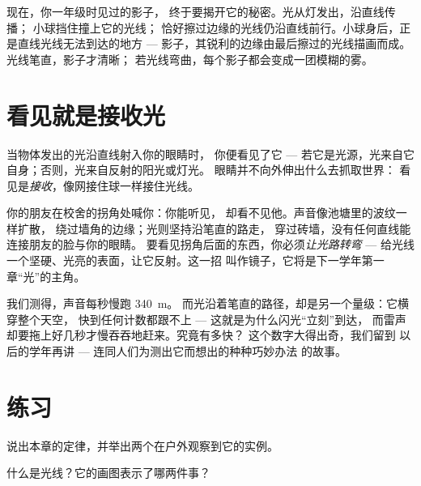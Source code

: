 \begin{example}[影子的成因终于讲清]\label{ex:g4:light-straight-lines:shadows}
现在，你一年级时见过的影子，
终于要揭开它的秘密。光从灯发出，沿直线传播；
小球挡住撞上它的光线；
恰好擦过边缘的光线仍沿直线前行。小球身后，正是直线光线无法到达的地方 ---
影子，其锐利的边缘由最后擦过的光线描画而成。
光线笔直，影子才清晰；
若光线弯曲，每个影子都会变成一团模糊的雾。
\end{example}

\section{看见就是接收光}

\begin{proposition}[看见是怎样发生的]\label{prop:g4:light-straight-lines:seeing}
当物体发出的光沿直线射入你的眼睛时，
你便看见了它 --- 若它是光源，光来自它自身；否则，光来自反射的阳光或灯光。
眼睛并不向外伸出什么去抓取世界：
看见是\emph{接收}，像网接住球一样接住光线。
\end{proposition}

\begin{example}[绕过墙角]\label{ex:g4:light-straight-lines:corner}
你的朋友在校舍的拐角处喊你：你能听见，
却看不见他。声音像池塘里的波纹一样扩散，
绕过墙角的边缘；光则坚持沿笔直的路走，
穿过砖墙，没有任何直线能连接朋友的脸与你的眼睛。
要看见拐角后面的东西，你必须\emph{让光路转弯} ---
给光线一个坚硬、光亮的表面，让它反射。这一招
叫作镜子，它将是下一学年第一章“光”的主角。
\end{example}

\begin{remark}[最快的跑者]\label{rem:g4:light-straight-lines:speed}
我们测得，声音每秒慢跑 \qty{340}{m}。
而光沿着笔直的路径，却是另一个量级：它横穿整个天空，
快到任何计数都跟不上 --- 这就是为什么闪光“立刻”到达，
而雷声却要拖上好几秒才慢吞吞地赶来。究竟有多快？
这个数字大得出奇，我们留到
以后的学年再讲 --- 连同人们为测出它而想出的种种巧妙办法
的故事。
\end{remark}

\section{练习}

\begin{exercise}[$\star$]\label{exo:g4:light-straight-lines:1}
说出本章的定律，并举出两个在户外观察到它的实例。
\end{exercise}

\begin{exercise}[$\star$]\label{exo:g4:light-straight-lines:2}
什么是光线？它的画图表示了哪两件事？
\end{exercise}

